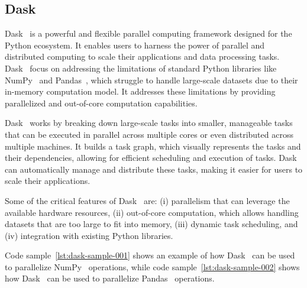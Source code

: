 \subsection{Dask}
\label{subsec:dask}

Dask~\cite{dask} is a powerful and flexible parallel computing framework designed for the Python ecosystem.
It enables users to harness the power of parallel and distributed computing to scale their applications and data processing tasks.
Dask~\cite{dask} focus on addressing the limitations of standard Python libraries like NumPy~\cite{numpy} and Pandas~\cite{pandas}, which struggle to handle large-scale datasets due to their in-memory computation model.
It addresses these limitations by providing parallelized and out-of-core computation capabilities.

Dask~\cite{dask} works by breaking down large-scale tasks into smaller, manageable tasks that can be executed in parallel across multiple cores or even distributed across multiple machines.
It builds a task graph, which visually represents the tasks and their dependencies, allowing for efficient scheduling and execution of tasks.
Dask~\cite{dask} can automatically manage and distribute these tasks, making it easier for users to scale their applications.

Some of the critical features of Dask~\cite{dask} are:
(i) parallelism that can leverage the available hardware resources,
(ii) out-of-core computation, which allows handling datasets that are too large to fit into memory,
(iii) dynamic task scheduling, and
(iv) integration with existing Python libraries.

Code sample~\ref{lst:dask-sample-001} shows an example of how Dask~\cite{dask} can be used to parallelize NumPy~\cite{numpy} operations, while code sample~\ref{lst:dask-sample-002} shows how Dask~\cite{dask} can be used to parallelize Pandas~\cite{pandas} operations.



